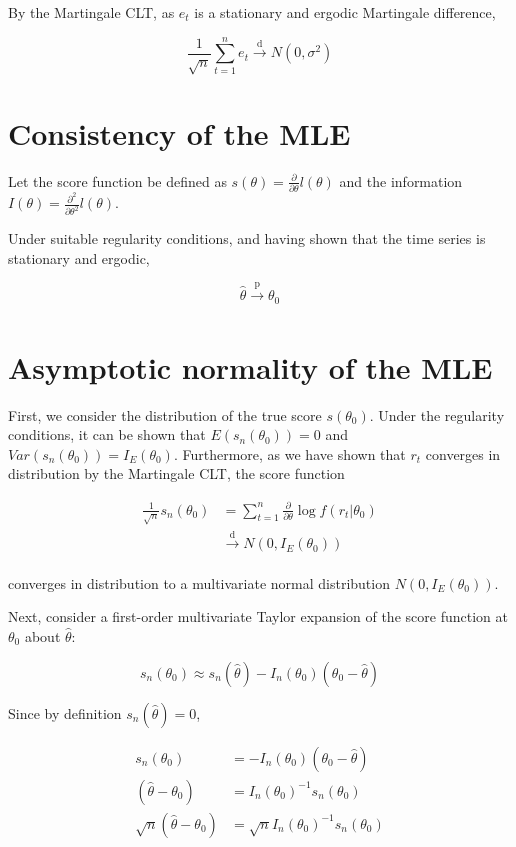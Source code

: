 \documentclass{article}
\begin{document}
By the Martingale CLT, as $e_t$ is a stationary and ergodic Martingale difference,

\[
\frac{1}{\sqrt{n}} \sum_{t=1}^n e_t \xrightarrow[]{\text{d}} N(0, \sigma^2)
\]


\section{Consistency of the MLE}

Let the score function be defined as $s(\theta) = \frac{\partial}{\partial\theta} l(\theta)$ and the information $I(\theta) = \frac{\partial^2}{\partial\theta^2} l(\theta)$. 

Under suitable regularity conditions, and having shown that the time series is stationary and ergodic,

\[
\hat{\theta} \xrightarrow[]{\text{p}} \theta_0
\]


\section{Asymptotic normality of the MLE}

First, we consider the distribution of the true score $s(\theta_0)$. Under the regularity conditions, it can be shown that $E(s_n(\theta_0)) = 0$ and $Var(s_n(\theta_0)) = I_E(\theta_0)$. Furthermore, as we have shown that $r_t$ converges in distribution by the Martingale CLT, the score function

\[
\begin{split}
 \frac{1}{\sqrt{n}} s_n(\theta_0) &= \sum_{t=1}^n \frac{\partial}{\partial\theta}\log f(r_t | \theta_0) \\ 
 &\xrightarrow[]{\text{d}} N(0, I_E(\theta_0))
\end{split}
\]

converges in distribution to a multivariate normal distribution $N(0, I_E(\theta_0))$.

Next, consider a first-order multivariate Taylor expansion of the score function at $\theta_0$ about $\hat{\theta}$:

\[
s_n(\theta_0) \approx s_n(\hat{\theta}) - I_n(\theta_0) (\theta_0 - \hat{\theta})
\]

Since by definition $s_n(\hat{\theta}) = 0$,

\[
\begin{split}
 s_n(\theta_0) &= - I_n(\theta_0) (\theta_0 - \hat{\theta}) \\
 (\hat{\theta} - \theta_0) &=  I_n(\theta_0)^{-1} s_n(\theta_0) \\
 \sqrt{n}(\hat{\theta} - \theta_0) &=  \sqrt{n} I_n(\theta_0)^{-1} s_n(\theta_0) 
\end{split}
\]
\end{document}
